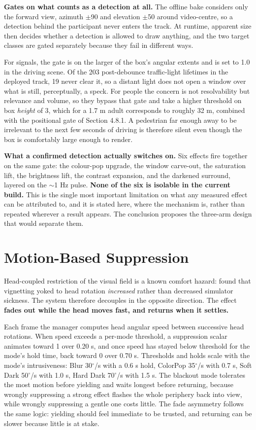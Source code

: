 \textbf{Gates on what counts as a detection at all.} The offline bake considers only the forward
view, azimuth $\pm$90\textdegree{} and elevation $\pm$50\textdegree{} around video-centre,
so a detection behind the participant never enters the track. At runtime, apparent size then decides
whether a detection is allowed to draw anything, and the two target classes are gated separately
because they fail in different ways.

For signals, the gate is on the larger of the box's angular extents and is set to
1.0\textdegree{} in the driving scene. Of the 203 post-debounce traffic-light lifetimes in the
deployed track, 19 never clear it, so a distant light does not open a window over what is still,
perceptually, a speck. For people the concern is not resolvability but relevance and volume, so they
bypass that gate and take a higher threshold on box \textit{height} of 3\textdegree{}, which for a
1.7 m adult corresponds to roughly 32 m, combined with the positional gate of Section 4.8.1. A
pedestrian far enough away to be irrelevant to the next few seconds of driving is therefore silent
even though the box is comfortably large enough to render.

\textbf{What a confirmed detection actually switches on.} Six effects fire together on the same gate:
the colour-pop upgrade, the window carve-out, the saturation lift, the brightness lift, the contrast
expansion, and the darkened surround, layered on the $\sim$1 Hz pulse. \textbf{None of the six is
isolable in the current build.} This is the single most important limitation on what any measured
effect can be attributed to, and it is stated here, where the mechanism is, rather than repeated
wherever a result appears. The conclusion proposes the three-arm design that would separate them.

\section{Motion-Based Suppression}

Head-coupled restriction of the visual field is a known comfort hazard: \citet{norouzi2018} found
that vignetting yoked to head rotation \textit{increased} rather than decreased simulator sickness.
The system therefore decouples in the opposite direction. The effect \textbf{fades out while the head
moves fast, and returns when it settles.}

Each frame the manager computes head angular speed between successive head rotations. When speed
exceeds a per-mode threshold, a suppression scalar animates toward 1 over 0.20 s, and once speed has
stayed below threshold for the mode's hold time, back toward 0 over 0.70 s. Thresholds and holds
scale with the mode's intrusiveness: Blur 30$^{\circ}$/s with a 0.6 s hold, ColorPop 35$^{\circ}$/s
with 0.7 s, Soft Dark 50$^{\circ}$/s with 1.0 s, Hard Dark 70$^{\circ}$/s with 1.5 s. The blackout
mode tolerates the most motion before yielding and waits longest before returning, because wrongly
suppressing a strong effect flashes the whole periphery back into view, while wrongly suppressing a
gentle one costs little. The fade asymmetry follows the same logic: yielding should feel immediate
to be trusted, and returning can be slower because little is at stake.

